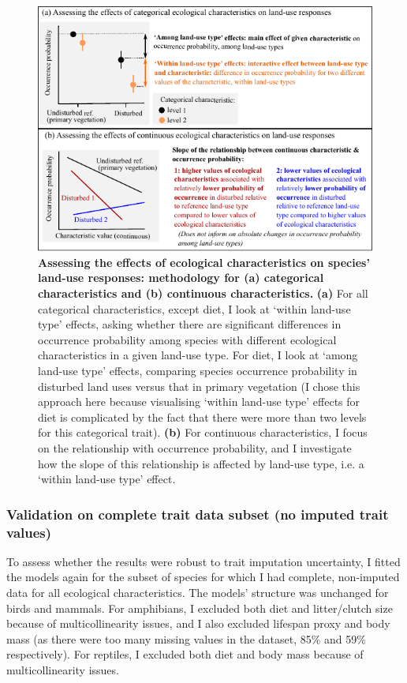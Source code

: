 \vspace{0.5cm}
\begin{figure}[h!]
\centering
\includegraphics[scale=1.6]{figures/Chapter4/Figure2}
\caption[Assessing the effects of ecological characteristics on species' land-use responses: methodology for (a) categorical characteristics and (b) continuous characteristics.]{\textbf{Assessing the effects of ecological characteristics on species' land-use responses: methodology for (a) categorical characteristics and (b) continuous characteristics.} \textbf{(a)} For all categorical characteristics, except diet, I look at `within land-use type' effects, asking whether there are significant differences in occurrence probability among species with different ecological characteristics in a given land-use type. For diet, I look at `among land-use type' effects, comparing species occurrence probability in disturbed land uses versus that in primary vegetation  (I chose this approach here because visualising `within land-use type' effects for diet is complicated by the fact that there were more than two levels for this categorical trait). \textbf{(b)} For continuous characteristics, I focus on the relationship with occurrence probability, and I investigate how the slope of this relationship is affected by land-use type, i.e. a `within land-use type' effect.}
\label{chap4_fig2}
\end{figure}

\subsubsection{Validation on complete trait data subset (no imputed trait values)}
To assess whether the results were robust to trait imputation uncertainty, I fitted the models again for the subset of species for which I had complete, non-imputed data for all ecological characteristics. The models' structure was unchanged for birds and mammals. For amphibians, I excluded both diet and litter/clutch size because of multicollinearity issues, and I also excluded lifespan proxy and body mass (as there were too many missing values in the dataset, 85\% and 59\% respectively). For reptiles, I excluded both diet and body mass because of multicollinearity issues.

